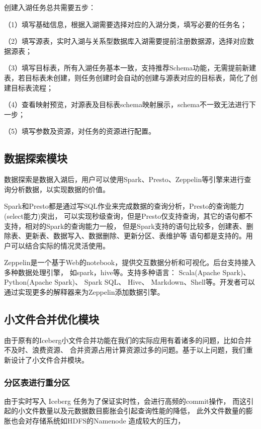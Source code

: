 创建入湖任务总共需要五步：

（1）填写基础信息，根据入湖需要选择对应的入湖分类，填写必要的任务名；

（2）填写源表，实时入湖与关系型数据库入湖需要提前注册数据源，选择对应数据源表；

（3）填写目标表，所有入湖任务基本一致，支持推荐Schema功能，无需提前新建表，若目标表未创建，则任务创建时会自动的创建与源表对应的目标表，简化了创建目标表流程；

（4）查看映射预览，对源表及目标表schema映射展示，schema不一致无法进行下一步；

（5）填写参数及资源，对任务的资源进行配置。

\subsection{数据探索模块}

数据探索是数据入湖后，用户可以使用Spark、Presto、Zeppelin等引擎来进行查询分析数据，以实现数据的价值。

Spark和Presto都是通过写SQL作业来完成数据的查询分析，Presto的查询能力(select能力)突出，
可以实现秒级查询，但是Presto仅支持查询，其它的语句都不支持，相对的Spark的查询能力一般，
但是Spark支持的语句比较多，创建表、删除表、更新表、数据写入、数据删除、更新分区、表维护等
语句都是支持的。用户可以结合实际的情况灵活使用。

Zeppelin是一个基于Web的notebook，提供交互数据分析和可视化。后台支持接入多种数据处理引擎，
如spark，hive等。支持多种语言： Scala(Apache Spark)、Python(Apache Spark)、
Spark SQL、 Hive、 Markdown、Shell等。开发者可以通过实现更多的解释器来为Zeppelin添加数据引擎。

\subsection{小文件合并优化模块}

由于原有的Iceberg小文件合并功能在我们的实际应用有着诸多的问题，比如合并不及时、浪费资源、
合并资源占用计算资源过多的问题。基于以上问题，我们重新设计了小文件合并模块。

\subsubsection{分区表进行重分区}

由于实时写入 Iceberg 任务为了保证实时性，会进行高频的commit操作，
而这引起的小文件数量以及元数据数目膨胀会引起查询性能的降低，
此外文件数量的膨胀也会对存储系统如HDFS的Namenode 造成较大的压力，


